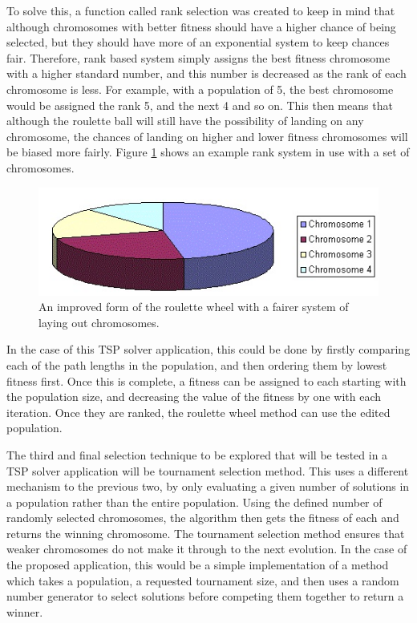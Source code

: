\documentclass[article]{IEEEtran}
\begin{document}
To solve this, a function called rank selection was created to keep in mind that although chromosomes with better fitness should have a higher chance of being selected, but they should have more of an exponential system to keep chances fair. Therefore, rank based system simply assigns the best fitness chromosome with a higher standard number, and this number is decreased as the rank of each chromosome is less. For example, with a population of 5, the best chromosome would be assigned the rank 5, and the next 4 and so on. This then means that although the roulette ball will still have the possibility of landing on any chromosome, the chances of landing on higher and lower fitness chromosomes will be biased more fairly. Figure \ref{fig:4} shows an example rank system in use with a set of chromosomes.
\begin{figure}[H]
\centering
\includegraphics[width=.8\linewidth]{images/rank}
\caption{An improved form of the roulette wheel with a fairer system of laying out chromosomes.}
\label{fig:4}
\end{figure}
In the case of this TSP solver application, this could be done by firstly comparing each of the path lengths in the population, and then ordering them by lowest fitness first. Once this is complete, a fitness can be assigned to each starting with the population size, and decreasing the value of the fitness by one with each iteration. Once they are ranked, the roulette wheel method can use the edited population.\par
The third and final selection technique to be explored that will be tested in a TSP solver application will be tournament selection method. This uses a different mechanism to the previous two, by only evaluating a given number of solutions in a population rather than the entire population. Using the defined number of randomly selected chromosomes, the algorithm then gets the fitness of each and returns the winning chromosome. The tournament selection method ensures that weaker chromosomes do not make it through to the next evolution. In the case of the proposed application, this would be a simple implementation of a method which takes a population, a requested tournament size, and then uses a random number generator to select solutions before competing them together to return a winner. 
\end{document}
